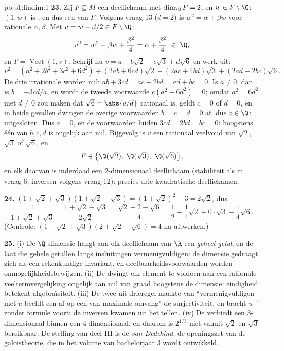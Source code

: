 \begin{solution}{pb:b1:findim:1}
\textbf{23.} Zij $F \subseteq M$ een deellichaam met $\dim_\Q F =
2$, en $w \in F \setminus \Q$: $(1, w)$ is , en dus een 
van $F$. Volgens vraag 13 ($d = 2$) is $w^2 = \alpha + \beta w$
voor rationale $\alpha, \beta$. Met $v = w - \beta/2 \in F
\setminus \Q$:
\[
v^2 = w^2 - \beta w + \frac{\beta^2}4 = \alpha + \frac{\beta^2}4
\;\in\; \Q,
\]
en $F = \operatorname{Vect}(1, v)$. Schrijf nu $v = a + b\sqrt2 +
c\sqrt3 + d\sqrt6$ en werk uit:
\[
v^2 = (a^2 + 2b^2 + 3c^2 + 6d^2)
+ (2ab + 6cd)\sqrt2 + (2ac + 4bd)\sqrt3 + (2ad + 2bc)\sqrt6 .
\]
De drie irrationale  worden nul: $ab + 3cd = ac + 2bd =
ad + bc = 0$. Is $a \neq 0$, dan is $b = -3cd/a$, en wordt de
tweede voorwaarde $c(a^2 - 6d^2) = 0$; omdat $a^2 = 6d^2$ met $d
\neq 0$ zou maken dat $\sqrt6 = \abs{a/d}$ rationaal is, geldt $c =
0$ of $d = 0$, en in beide gevallen dwingen de overige voorwaarden
$b = c = d = 0$ af, dus $v \in \Q$: uitgesloten. Dus $a = 0$, en de
voorwaarden luiden $3cd = 2bd = bc = 0$: hoogstens één van $b, c,
d$ is ongelijk aan nul. Bijgevolg is $v$ een rationaal veelvoud van
$\sqrt2$, $\sqrt3$ of $\sqrt6$, en
\[
F \in \bigl\{\Q(\sqrt2),\ \Q(\sqrt3),\ \Q(\sqrt6)\bigr\} ,
\]
en elk daarvan is inderdaad een $2$-dimensionaal deellichaam
(stabiliteit als in vraag 6, inversen volgens vraag 12): precies
drie kwadratische deellichamen.

\textbf{24.} $(1 + \sqrt2 + \sqrt3)(1 + \sqrt2 - \sqrt3) = (1 +
\sqrt2)^2 - 3 = 2\sqrt2$, dus
\[
\frac1{1 + \sqrt2 + \sqrt3}
= \frac{1 + \sqrt2 - \sqrt3}{2\sqrt2}
= \frac{\sqrt2 + 2 - \sqrt6}{4}
= \frac12 + \frac14\sqrt2 + 0\cdot\sqrt3 - \frac14\sqrt6 .
\]
(Controle: $(1 + \sqrt2 + \sqrt3)(2 + \sqrt2 - \sqrt6) = 4$ na
uitwerken.)

\textbf{25.} (i) De $\Q$-dimensie hangt aan elk deellichaam van
$\R$ een \emph{geheel getal}, en de  laat die gehele
getallen langs insluitingen vermenigvuldigen: de dimensie gedraagt
zich als een rekenkundige invariant, en
deelbaarheidsvoorwaarden worden onmogelijkheidsbewijzen. (ii) De
 dwingt elk element te voldoen aan een rationale
veeltermvergelijking ongelijk aan nul van graad hoogstens de
dimensie: eindigheid betekent algebraïciteit. (iii) De
twee-uit-drieregel maakte van ``vermenigvuldigen met $u$ beeldt een
 af op een  van maximale omvang'' de
surjectiviteit, en bracht $u^{-1}$ zonder formule voort: de
inversen kwamen uit het tellen. (iv) De  verbiedt een
$3$-dimensionaal  binnen een $4$-dimensionaal, en daarom is
$2^{1/3}$ niet vanuit $\sqrt2$ en $\sqrt3$ bereikbaar. De stelling
van deel III is de \emph{ van Dedekind}, de openingszet van
de galoistheorie, die in het volume van bachelorjaar 3 wordt
ontwikkeld.
\end{solution}
